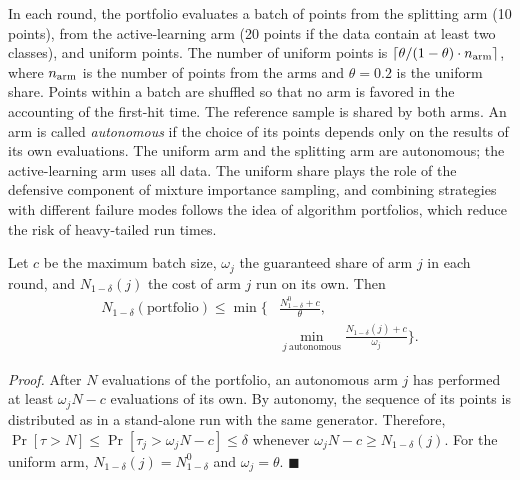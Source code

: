In each round, the portfolio evaluates a batch of points from the splitting arm (10 points), from the active-learning arm (20 points if the data contain at least two classes), and uniform points. The number of uniform points is $\lceil\theta/(1-\theta)\cdot n_{\rm arm}\rceil$, where $n_{\rm arm}$ is the number of points from the arms and $\theta=0.2$ is the uniform share. Points within a batch are shuffled so that no arm is favored in the accounting of the first-hit time. The reference sample is shared by both arms. An arm is called \emph{autonomous} if the choice of its points depends only on the results of its own evaluations. The uniform arm and the splitting arm are autonomous; the active-learning arm uses all data. The uniform share plays the role of the defensive component of mixture importance sampling,\cite{Hesterberg1995} and combining strategies with different failure modes follows the idea of algorithm portfolios, which reduce the risk of heavy-tailed run times.\cite{Huberman1997,GomesSelman2001}

\begin{proposition}\label{prop:portfolio}
Let $c$ be the maximum batch size, $\omega_j$ the guaranteed share of arm $j$ in each round, and $N_{1-\delta}(j)$ the cost of arm $j$ run on its own. Then
\begin{equation}
\begin{split}
N_{1-\delta}(\text{portfolio})\le\min\biggl\{&\frac{N^0_{1-\delta}+c}{\theta},\\
&\min_{j\ \text{autonomous}}\frac{N_{1-\delta}(j)+c}{\omega_j}\biggr\}.
\end{split}
\label{eq:portfolio}
\end{equation}
\end{proposition}
\textit{Proof.} After $N$ evaluations of the portfolio, an autonomous arm $j$ has performed at least $\omega_jN-c$ evaluations of its own. By autonomy, the sequence of its points is distributed as in a stand-alone run with the same generator. Therefore, $\Pr[\tau>N]\le\Pr[\tau_j>\omega_jN-c]\le\delta$ whenever $\omega_jN-c\ge N_{1-\delta}(j)$. For the uniform arm, $N_{1-\delta}(j)=N^0_{1-\delta}$ and $\omega_j=\theta$. \hfill$\blacksquare$

